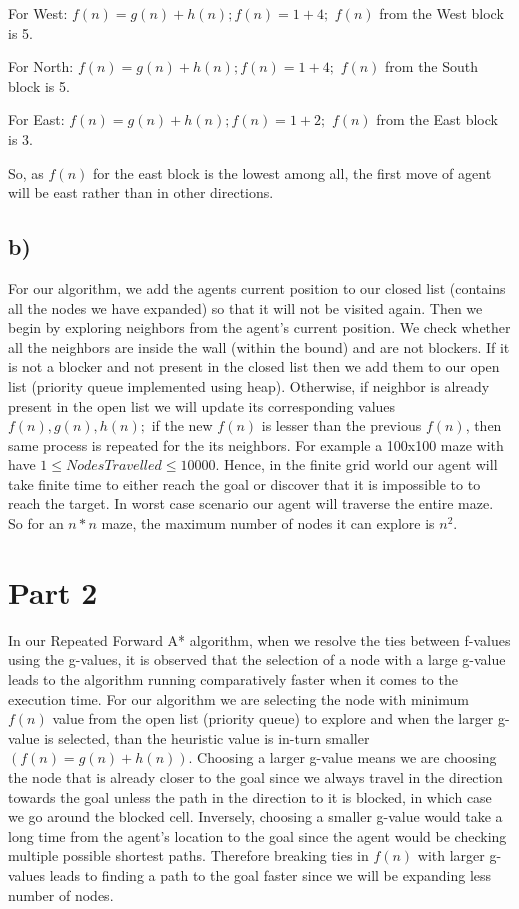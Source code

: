 \documentclass{article}
\begin{document}
For West: 
$f(n) = g(n) + h(n);
f(n) = 1 + 4;$
$f(n)$ from the West block is 5.

For North:
$f(n) = g(n) + h(n);
f(n) = 1 + 4;$
$f(n)$ from the South block is 5.

For East:
$f(n) = g(n) + h(n);
f(n) = 1 + 2;$
$f(n)$ from the East block is 3.

So, as $f(n)$ for the east block is the lowest among all, the first move of agent will be east rather than in other directions.

\subsection*{b)}
For our algorithm, we add the agents current position to our closed list (contains all the nodes we have expanded) so that it will not be visited again. Then we begin by exploring neighbors from the agent's current position. We check whether all the neighbors are inside the wall (within the bound) and are not blockers. If it is not a blocker and not present in the closed list then we add them to our open list (priority queue implemented using heap). Otherwise, if neighbor is already present in the open list we will update its corresponding values $f(n), g(n), h(n);$ if the new $f(n)$ is lesser than the previous $f(n)$, then same process is repeated for the its neighbors.
For example a 100x100 maze with have
$1 \le Nodes Travelled \le 10000$.
Hence, in the finite grid world our agent will take finite time to either reach the goal or discover that it is impossible to to reach the target. In worst case scenario our agent will traverse the entire maze. So for an $n*n$ maze, the maximum number of nodes it can explore is $n^2$.

\section*{Part 2}

In our Repeated Forward A* algorithm, when we resolve the ties between f-values using the g-values, it is observed that the selection of a node with a large g-value leads to the algorithm running comparatively faster when it comes to the execution time. 
For our algorithm we are selecting the node with minimum $f(n)$ value from the open list (priority queue) to explore and when the larger g-value is selected, than the heuristic value is in-turn smaller $(f(n) = g(n) + h(n))$. Choosing a larger g-value means we are choosing the node that is already closer to the goal since we always travel in the direction towards the goal unless the path in the direction to it is blocked, in which case we go around the blocked cell. Inversely, choosing a smaller g-value would take a long time from the agent’s location to the goal since the agent would be checking multiple possible shortest paths. Therefore breaking ties in $f(n)$ with larger g-values leads to finding a path to the goal faster since we will be expanding less number of nodes.
\end{document}

